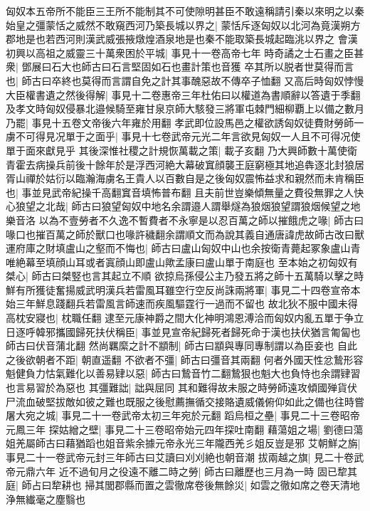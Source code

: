 匈奴本五帝所不能臣三王所不能制其不可使隙明甚臣不敢遠稱請引秦以來明之以秦始皇之彊蒙恬之威然不敢窺西河乃築長城以界之|{
	蒙恬斥逐匈奴以北河為竟漢朔方郡地是也若西河則漢武威張掖燉煌酒泉地是也秦不能取築長城起臨洮以界之}
會漢初興以高祖之威靈三十萬衆困於平城|{
	事見十一卷高帝七年}
時奇譎之士石畫之臣甚衆|{
	鄧展曰石大也師古曰石言堅固如石也畫計策也音獲}
卒其所以脱者世莫得而言也|{
	師古曰卒終也莫得而言謂自免之計其事醜惡故不傳卒子恤翻}
又高后時匈奴悖慢大臣權書遺之然後得解|{
	事見十二卷惠帝三年杜佑曰以權道為書順辭以答遺于季翻}
及孝文時匈奴侵暴北邉候騎至雍甘泉京師大駭發三將軍屯棘門細柳覇上以備之數月乃罷|{
	事見十五卷文帝後六年雍於用翻}
孝武即位設馬邑之權欲誘匈奴徒費財勞師一虜不可得見况單于之面乎|{
	事見十七卷武帝元光二年言欲見匈奴一人且不可得况使單于面來獻見乎}
其後深惟社稷之計規恢萬載之策|{
	載子亥翻}
乃大興師數十萬使衛青霍去病操兵前後十餘年於是浮西河絶大幕破窴顔襲王庭窮極其地追犇逐北封狼居胥山禪於姑衍以臨瀚海虜名王貴人以百數自是之後匈奴震怖益求和親然而未肯稱臣也|{
	事並見武帝紀操千高翻窴音填怖普布翻}
且夫前世豈樂傾無量之費役無罪之人快心狼望之北哉|{
	師古曰狼望匈奴中地名余謂邉人謂舉燧為狼烟狼望謂狼烟候望之地樂音洛}
以為不壹勞者不久逸不暫費者不永寧是以忍百萬之師以摧餓虎之喙|{
	師古曰喙口也摧百萬之師於獸口也喙許穢翻余謂順文而為說其義自通唐諱虎故師古改曰獸}
運府庫之財填盧山之壑而不悔也|{
	師古曰盧山匈奴中山也余按衛青薨起冢象盧山青唯絶幕至填顔山耳或者寘顔山即盧山歟孟康曰盧山單于南庭也}
至本始之初匈奴有桀心|{
	師古曰桀竪也言其起立不順}
欲掠烏孫侵公主乃發五將之師十五萬騎以擊之時鮮有所獲徒奮揚威武明漢兵若雷風耳雖空行空反尚誅兩將軍|{
	事見二十四卷宣帝本始三年鮮息踐翻兵若雷風言師速而疾風驅霆行一過而不留也}
故北狄不服中國未得高枕安寢也|{
	枕職任翻}
逮至元康神爵之間大化神明鴻恩溥洽而匈奴内亂五單于争立日逐呼韓邪攜國歸死扶伏稱臣|{
	事並見宣帝紀歸死者歸死命于漢也扶伏猶言匍匐也師古曰伏音蒲北翻}
然尚羈縻之計不顓制|{
	師古曰顓與專同專制謂以為臣妾也}
自此之後欲朝者不距|{
	朝直遥翻}
不欲者不彊|{
	師古曰彊音其兩翻}
何者外國天性忿鷙形容魁健負力怙氣難化以善易肄以惡|{
	師古曰鷙音竹二翻鷙狠也魁大也負恃也余謂肄習也言易習於為惡也}
其彊難詘|{
	詘與屈同}
其和難得故未服之時勞師遠攻傾國殚貨伏尸流血破堅拔敵如彼之難也既服之後慰薦撫循交接賂遺威儀俯仰如此之備也往時嘗屠大宛之城|{
	事見二十一卷武帝太初三年宛於元翻}
蹈烏桓之壘|{
	事見二十三卷昭帝元鳳三年}
探姑繒之壁|{
	事見二十三卷昭帝始元四年探吐南翻}
藉蕩姐之場|{
	劉德曰蕩姐羌屬師古曰藉猶蹈也姐音紫余據元帝永光三年隴西羌彡姐反豈是邪}
艾朝鮮之旃|{
	事見二十一卷武帝元封三年師古曰艾讀曰刈刈絶也朝音潮}
拔兩越之旗|{
	見二十卷武帝元鼎六年}
近不過旬月之役遠不離二時之勞|{
	師古曰離歷也三月為一時}
固已犂其庭|{
	師占曰犂耕也}
掃其閭郡縣而置之雲徹席卷後無餘災|{
	如雲之徹如席之卷天清地浄無纎毫之塵翳也}
